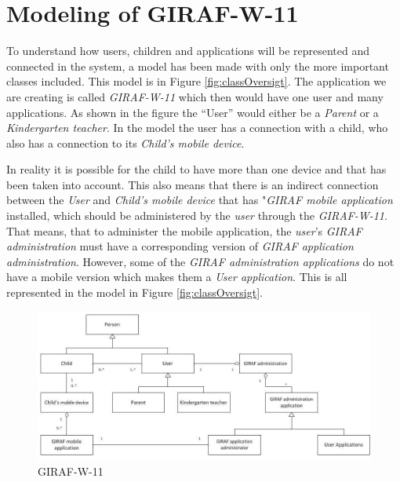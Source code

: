 \section{Modeling of GIRAF-W-11}
To understand how users, children and applications will be represented and connected in the system, a model  has been made with only the more important classes included. This model is in Figure \vref{fig:classOversigt}. The application we are creating is called \emph{GIRAF-W-11} which then would have one user and many applications. As shown in the figure the ``User'' would either be a \emph{Parent} or a \emph{Kindergarten teacher}. In the model the user has a connection with a child, who also has a connection to its \emph{Child's mobile device}.

In reality it is possible for the child to have more than one device and that has been taken into account. This also means that there is an indirect connection between the \emph{User} and \emph{Child's mobile device} that has "\emph{GIRAF mobile application} installed, which should be administered by the \emph{user} through the \emph{GIRAF-W-11}. That means, that to administer the mobile application, the \emph{user}'s \emph{GIRAF administration} must have a corresponding version of \emph{GIRAF application administration}. However, some of the \emph{GIRAF administration applications} do not have a mobile version which makes them a \emph{User application}. This is all represented in the model in Figure \vref{fig:classOversigt}.


\begin{figure}[!ht]
	\centering
		\includegraphics[width=1.00\textwidth]{img/classOversigt.jpg}
	\caption{GIRAF-W-11}
	\label{fig:classOversigt}
\end{figure}
\newpage